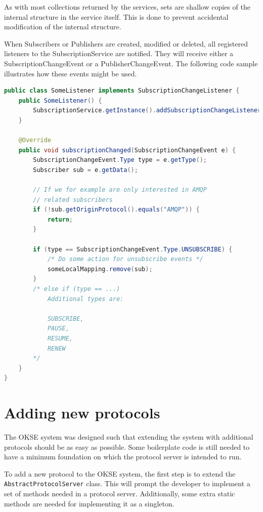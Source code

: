 As with most collections returned by the services, sets are shallow copies of the internal structure in the service itself. This is done to prevent accidental modification of the internal structure.

When Subscribers or Publishers are created, modified or deleted, all registered listeners to the SubscriptionService are notified. They will receive either a SubscriptionChangeEvent or a PublisherChangeEvent. The following code sample illustrates how these events might be used.

\begin{lstlisting}[language=Java, captionpos=b, caption=Use of the SubscriptionService listener support, frame=bt, showstringspaces=false]
public class SomeListener implements SubscriptionChangeListener {
    public SomeListener() {
        SubscriptionService.getInstance().addSubscriptionChangeListener(this);
    }
    
    @Override
    public void subscriptionChanged(SubscriptionChangeEvent e) {
        SubscriptionChangeEvent.Type type = e.getType();
        Subscriber sub = e.getData();
        
        // If we for example are only interested in AMQP
        // related subscribers
        if (!sub.getOriginProtocol().equals("AMQP")) {
            return;
        }
        
        if (type == SubscriptionChangeEvent.Type.UNSUBSCRIBE) {
            /* Do some action for unsubscribe events */
            someLocalMapping.remove(sub);
        }
        /* else if (type == ...)
            Additional types are:
            
            SUBSCRIBE,
            PAUSE,
            RESUME,
            RENEW
        */
    }
}
\end{lstlisting}

\section{Adding new protocols}
\label{sec:adding-new-protocols}

The OKSE system was designed such that extending the system with additional protocols should be as easy as possible. Some boilerplate code is still needed to have a minimum foundation on which the protocol server is intended to run.

To add a new protocol to the OKSE system, the first step is to extend the \\\verb!AbstractProtocolServer! class. This will prompt the developer to implement a set of methods needed in a protocol server. Additionally, some extra static methods are needed for implementing it as a singleton.

